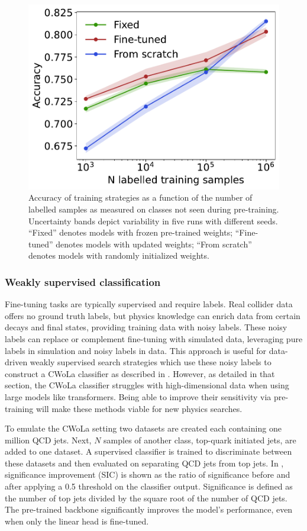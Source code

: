 \begin{figure}[tp!]
    \centering
    \includegraphics[width=0.5\columnwidth]{Figures/foundation_models/mpm1/jetclass_nc_two_40_accuracy.pdf}
    \caption{Accuracy of training strategies as a function of the number of labelled samples as measured on classes not seen during pre-training.
        Uncertainty bands depict variability in five runs with different seeds.
        ``Fixed'' denotes models with frozen pre-trained weights; ``Fine-tuned'' denotes models with updated weights; ``From scratch'' denotes models with randomly initialized weights.}
    \label{fig:fine_tune_jetclass_ood}
\end{figure}

\subsubsection{Weakly supervised classification}

Fine-tuning tasks are typically supervised and require labels.
Real collider data offers no ground truth labels, but physics knowledge can enrich data from certain decays and final states, providing training data with noisy labels.
These noisy labels can replace or complement fine-tuning with simulated data, leveraging pure labels in simulation and noisy labels in data.
This approach is useful for data-driven weakly supervised search strategies which use these noisy labels to construct a CWoLa classifier as described in .
However, as detailed in that section, the CWoLa classifier struggles with high-dimensional data when using large models like transformers.
Being able to improve their sensitivity via pre-training will make these methods viable for new physics searches.

To emulate the CWoLa setting two datasets are created each containing one million QCD jets.
Next, $N$ samples of another class, top-quark initiated jets, are added to one dataset.
A supervised classifier is trained to discriminate between these datasets and then evaluated on separating QCD jets from top jets.
In , significance improvement (SIC) is shown as the ratio of significance before and after applying a 0.5 threshold on the classifier output.
Significance is defined as the number of top jets divided by the square root of the number of QCD jets.
The pre-trained backbone significantly improves the model's performance, even when only the linear head is fine-tuned.

